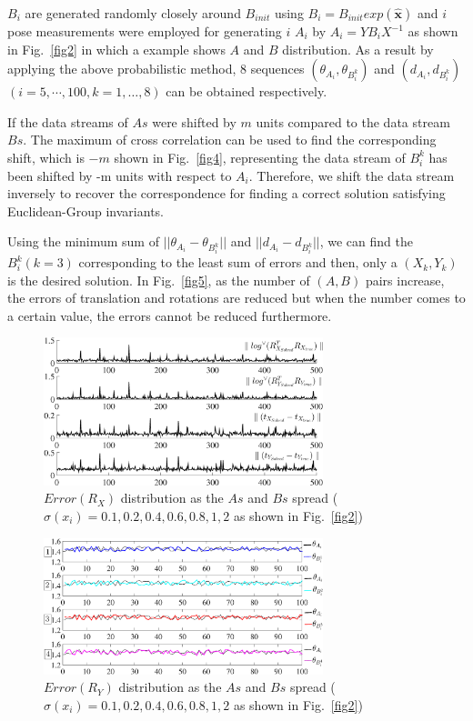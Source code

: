 \documentclass[letterpaper, 10 pt, conference]{ieeeconf}  %
\begin{document}
$B_{i}$ are generated randomly closely around $B_{init}$ using $B_i = B_{init} exp(\mathbf{\widehat{x}})$ and $i$ pose measurements were employed for generating $i$ $A_{i}$ by $A_{i} = YB_{i}X^{-1}$ as shown in Fig.~\ref{fig2} in which a example shows $A$ and $B$ distribution. As a result by applying the above probabilistic method, 8 sequences $(\theta_{A_{i}},\theta_{B_{i}^{k}})$ and $(d_{A_{i}},d_{B_{i}^{k}})$ $ (i=5,\cdots, 100, k=1,\dots,8)$ can be obtained respectively.

If the data streams of $As$ were shifted by $m$ units compared to the data stream $Bs$. The maximum of cross correlation can be used to find the corresponding shift, which is $-m$ shown in Fig.~\ref{fig4}, representing the data stream of $B_{i}^{k}$ has been shifted by -m units with respect to ${A_{i}}$. Therefore, we shift the data stream inversely to recover the correspondence for finding a correct solution satisfying Euclidean-Group invariants.


Using the minimum sum of $||\theta_{A_{i}} - \theta_{B_{i}^{k}}||$ and $||d_{A_{i}} - d_{B_{i}^{k}}||$, we can find the ${B_{i}^{k}}(k=3)$ corresponding to the least sum of errors and then, only a $(X_k,Y_k)$ is the desired solution. In Fig.~\ref{fig5}, as the number of $(A,B)$ pairs increase, the errors of translation and rotations are reduced but when the number comes to a certain value, the errors cannot be reduced furthermore.

\begin{center}
\begin{figure}
\centering
\includegraphics[width=3.2in]{fig6.eps}
\caption{
$Error(R_X)$ distribution as the $As$ and $Bs$ spread ($\sigma(x_i) = 0.1, 0.2, 0.4, 0.6, 0.8, 1, 2$ as shown in Fig.~\ref{fig2})
}
\label{fig6}
\end{figure}
\end{center}

\begin{center}
\begin{figure}
\centering
\includegraphics[width=3.2in]{fig7.eps}
\caption{
$Error(R_Y)$ distribution as the $As$ and $Bs$ spread ($\sigma(x_i) = 0.1, 0.2, 0.4, 0.6, 0.8, 1, 2$ as shown in Fig.~\ref{fig2})
}
\label{fig7}
\end{figure}
\end{center}
\end{document}
